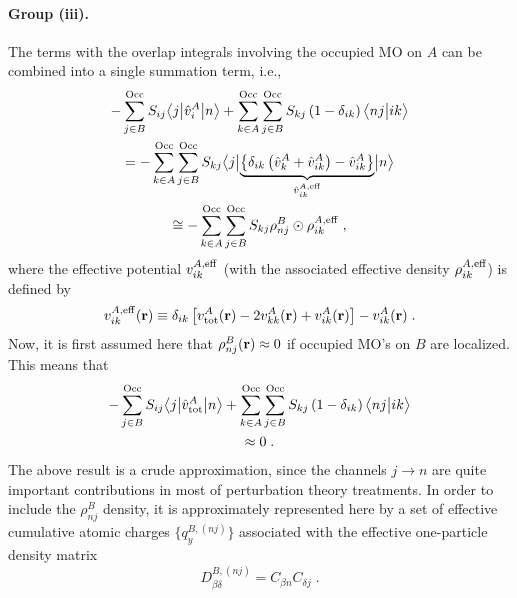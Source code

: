 \paragraph{Group (iii).}
The terms with the overlap integrals involving the occupied MO on $A$
can be combined into a single summation term, i.e.,
\begin{multline}
       - \sum_{j\in B}^{\rm Occ} S_{ij} \tBraKet{j}{\hat{v}^A_{i} }{n}  
     + \sum_{k\in A}^{\rm Occ} \sum_{j\in B}^{\rm Occ}  
        S_{kj} \left( 1 - \delta_{ik} \right)
        \BraKet{nj}{ik} \\ = -
 \sum_{k\in A}^{\rm Occ} 
 \sum_{j\in B}^{\rm Occ}
 S_{kj} 
 \tBraKet{j}{
 \underbrace{
 \left\{ 
  \delta_{ik} \left( \hat{v}^A_{k} + \hat{v}^A_{ik} \right)   - \hat{v}^A_{ik}
 \right\} 
  }_{\hat{v}^{A,{\rm eff}}_{ik}}
 }{n}  \\ \cong -
%
  \sum_{k\in A}^{\rm Occ} 
 \sum_{j\in B}^{\rm Occ}
 S_{kj} 
 \rho_{nj}^B \odot \rho^{A,{\rm eff}}_{ik} \;,
\end{multline}
%
where the effective potential ${v}^{A,{\rm eff}}_{ik}$ (with the associated 
effective density $\rho^{A,{\rm eff}}_{ik}$) 
is defined by
%
\begin{equation} \label{e:ct.group-iii.oep}
 {v}^{A,{\rm eff}}_{ik}({\bf r}) \equiv
 \delta_{ik} 
 \left[
  v^A_{\rm tot} ({\bf r}) - 2 v^A_{kk} ({\bf r}) + v^A_{ik} ({\bf r})
 \right] 
  - v^A_{ik} ({\bf r}) \;.
\end{equation}
%
Now, it is first assumed here that $\rho^{B}_{nj} ({\bf r}) \approx 0$ if occupied MO's on $B$ are localized.
This means that
%
\begin{multline} \label{e:ct.group-iii.final.a}
        - \sum_{j\in B}^{\rm Occ} S_{ij} \bigl\langle {j} \bigl\lvert {\hat{v}^A_{\rm tot} } \bigl\lvert {n} \bigr\rangle  
     + \sum_{k\in A}^{\rm Occ} \sum_{j\in B}^{\rm Occ}  
        S_{kj} \left( 1 - \delta_{ik} \right)
        \bigl\langle {nj} \bigl\lvert {ik} \bigr\rangle \\ 
    \approx 0 \;.
\end{multline}
%
The above result is a crude approximation, since the channels $j\rightarrow n$
are quite important contributions in most of perturbation theory treatments.
In order to include the $\rho^{B}_{nj}$ density, it is approximately represented here by a set of effective 
cumulative
atomic charges $\{ q^{B,(nj)}_{y} \}$ associated with the effective one\hyp{}particle density matrix
%
\begin{equation}
 D^{B,(nj)}_{\beta\delta} = C_{\beta n} C_{\delta j} \;.
\end{equation}
